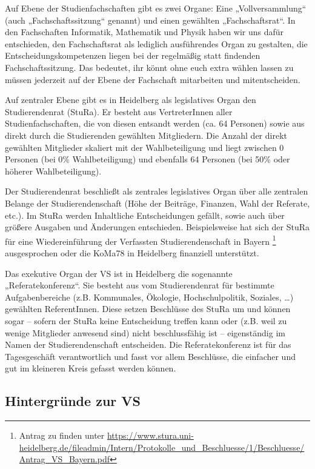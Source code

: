 Auf Ebene der Studienfachschaften gibt es zwei Organe: Eine „Vollversammlung“ (auch „Fachschaftssitzung“ genannt) und einen gewählten „Fachschaftsrat“. In den Fachschaften Informatik, Mathematik und Physik haben wir uns dafür entschieden, den Fachschaftsrat als lediglich ausführendes Organ zu gestalten, die Entscheidungskompetenzen liegen bei der regelmäßig statt findenden Fachschaftssitzung. Das bedeutet, ihr könnt ohne euch extra wählen lassen zu müssen jederzeit auf der Ebene der Fachschaft mitarbeiten und mitentscheiden.

Auf zentraler Ebene gibt es in Heidelberg als legislatives Organ den Studierendenrat (StuRa). Er besteht aus VertreterInnen aller Studienfachschaften, die von diesen entsandt werden (ca. 64 Personen) sowie aus direkt durch die Studierenden gewählten Mitgliedern. Die Anzahl der direkt gewählten Mitglieder skaliert mit der Wahlbeteiligung und liegt zwischen 0 Personen (bei 0\% Wahlbeteiligung) und ebenfalls 64 Personen (bei 50\% oder höherer Wahlbeteiligung).

Der Studierendenrat beschließt als zentrales legislatives Organ über alle zentralen Belange der Studierendenschaft (Höhe der Beiträge, Finanzen, Wahl der Referate, etc.). Im StuRa werden Inhaltliche Entscheidungen gefällt, sowie auch über größere Ausgaben und Änderungen entschieden. Beispielsweise hat sich der StuRa für eine Wiedereinführung der Verfassten Studierendenschaft in Bayern \footnote{Antrag zu finden unter \url{https://www.stura.uni-heidelberg.de/fileadmin/Intern/Protokolle_und_Beschluesse/1/Beschluesse/Antrag_VS_Bayern.pdf}} ausgesprochen oder die KoMa78 in Heidelberg finanziell unterstützt.


Das exekutive Organ der VS ist in Heidelberg die sogenannte „Referatekonferenz“. Sie besteht aus vom Studierendenrat für bestimmte Aufgabenbereiche (z.B. Kommunales, Ökologie, Hochschulpolitik, Soziales, \dots) gewählten ReferentInnen. Diese setzen Beschlüsse des StuRa um und können sogar -- sofern der StuRa keine Entscheidung treffen kann oder (z.B. weil zu wenige Mitglieder anwesend sind) nicht beschlussfähig ist -- eigenständig im Namen der Studierendenschaft entscheiden. Die Referatekonferenz ist für das Tagesgeschäft verantwortlich und fasst vor allem Beschlüsse, die einfacher und gut im kleineren Kreis gefasst werden können. 

\subsection{Hintergründe zur VS}

